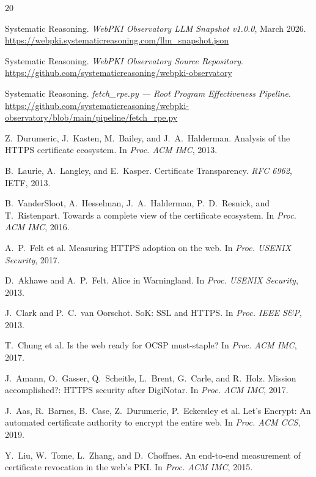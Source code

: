 \documentclass[10pt,twocolumn,letterpaper]{article}
\begin{document}
\begin{thebibliography}{20}
\setlength{\itemsep}{1pt}

Systematic Reasoning.
\textit{WebPKI Observatory LLM Snapshot v1.0.0}, March 2026.
\url{https://webpki.systematicreasoning.com/llm_snapshot.json}

Systematic Reasoning.
\textit{WebPKI Observatory Source Repository}.
\url{https://github.com/systematicreasoning/webpki-observatory}

Systematic Reasoning.
\textit{fetch\_rpe.py --- Root Program Effectiveness Pipeline}.
\url{https://github.com/systematicreasoning/webpki-observatory/blob/main/pipeline/fetch_rpe.py}

Z.~Durumeric, J.~Kasten, M.~Bailey, and J.~A.~Halderman.
Analysis of the HTTPS certificate ecosystem.
In \textit{Proc. ACM IMC}, 2013.

B.~Laurie, A.~Langley, and E.~Kasper.
Certificate Transparency.
\textit{RFC 6962}, IETF, 2013.

B.~VanderSloot, A.~Hesselman, J.~A.~Halderman, P.~D.~Resnick, and T.~Ristenpart.
Towards a complete view of the certificate ecosystem.
In \textit{Proc. ACM IMC}, 2016.

A.~P.~Felt et al.
Measuring HTTPS adoption on the web.
In \textit{Proc. USENIX Security}, 2017.

D.~Akhawe and A.~P.~Felt.
Alice in Warningland.
In \textit{Proc. USENIX Security}, 2013.

J.~Clark and P.~C.~van Oorschot.
SoK: SSL and HTTPS.
In \textit{Proc. IEEE S\&P}, 2013.

T.~Chung et al.
Is the web ready for OCSP must-staple?
In \textit{Proc. ACM IMC}, 2017.

J.~Amann, O.~Gasser, Q.~Scheitle, L.~Brent, G.~Carle, and R.~Holz.
Mission accomplished?: HTTPS security after DigiNotar.
In \textit{Proc. ACM IMC}, 2017.

J.~Aas, R.~Barnes, B.~Case, Z.~Durumeric, P.~Eckersley et al.
Let's Encrypt: An automated certificate authority to encrypt the entire web.
In \textit{Proc. ACM CCS}, 2019.

Y.~Liu, W.~Tome, L.~Zhang, and D.~Choffnes.
An end-to-end measurement of certificate revocation in the web's PKI.
In \textit{Proc. ACM IMC}, 2015.


\end{thebibliography}
\end{document}
